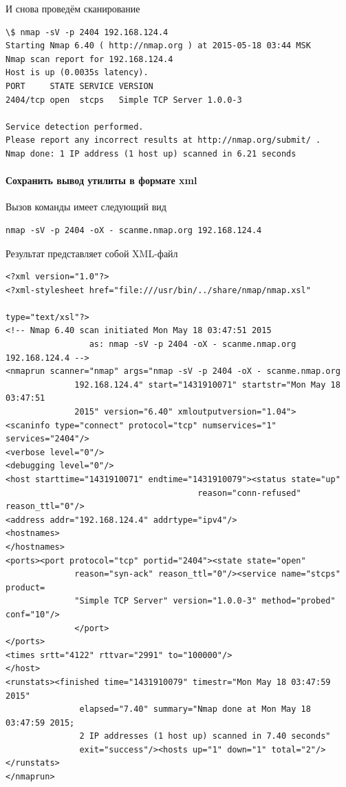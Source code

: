 \documentclass[a4paper, 12pt]{article}		%
\begin{document}
И снова проведём сканирование

\begin{Verbatim}[frame=single]
\$ nmap -sV -p 2404 192.168.124.4
Starting Nmap 6.40 ( http://nmap.org ) at 2015-05-18 03:44 MSK
Nmap scan report for 192.168.124.4
Host is up (0.0035s latency).
PORT     STATE SERVICE VERSION
2404/tcp open  stcps   Simple TCP Server 1.0.0-3

Service detection performed. 
Please report any incorrect results at http://nmap.org/submit/ .
Nmap done: 1 IP address (1 host up) scanned in 6.21 seconds
\end{Verbatim}

\paragraph{Сохранить вывод утилиты в формате xml}

Вызов команды имеет следующий вид
\begin{Verbatim}[frame=single]
nmap -sV -p 2404 -oX - scanme.nmap.org 192.168.124.4
\end{Verbatim}

Результат представляет собой XML-файл
\begin{Verbatim}[frame=single]
<?xml version="1.0"?>
<?xml-stylesheet href="file:///usr/bin/../share/nmap/nmap.xsl"
                                                            type="text/xsl"?>
<!-- Nmap 6.40 scan initiated Mon May 18 03:47:51 2015
                 as: nmap -sV -p 2404 -oX - scanme.nmap.org 192.168.124.4 -->
<nmaprun scanner="nmap" args="nmap -sV -p 2404 -oX - scanme.nmap.org
              192.168.124.4" start="1431910071" startstr="Mon May 18 03:47:51
              2015" version="6.40" xmloutputversion="1.04">
<scaninfo type="connect" protocol="tcp" numservices="1" services="2404"/>
<verbose level="0"/>
<debugging level="0"/>
<host starttime="1431910071" endtime="1431910079"><status state="up"
                                       reason="conn-refused" reason_ttl="0"/>
<address addr="192.168.124.4" addrtype="ipv4"/>
<hostnames>
</hostnames>
<ports><port protocol="tcp" portid="2404"><state state="open"
              reason="syn-ack" reason_ttl="0"/><service name="stcps" product=
              "Simple TCP Server" version="1.0.0-3" method="probed" conf="10"/>
              </port>
</ports>
<times srtt="4122" rttvar="2991" to="100000"/>
</host>
<runstats><finished time="1431910079" timestr="Mon May 18 03:47:59 2015"
               elapsed="7.40" summary="Nmap done at Mon May 18 03:47:59 2015;
               2 IP addresses (1 host up) scanned in 7.40 seconds"
               exit="success"/><hosts up="1" down="1" total="2"/>
</runstats>
</nmaprun>
\end{Verbatim}
\end{document}
